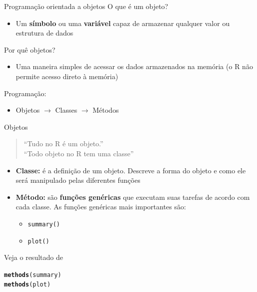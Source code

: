 \documentclass[10pt,handout]{beamer}\usepackage[]{graphicx}\usepackage[]{color}
\makeatletter
\newcommand{\hlstd}[1]{\textcolor[rgb]{0.345,0.345,0.345}{#1}}%
\newcommand{\hlkwd}[1]{\textcolor[rgb]{0.737,0.353,0.396}{\textbf{#1}}}%
\newenvironment{kframe}{%
 \def\at@end@of@kframe{}%
 \ifinner\ifhmode%
  \def\at@end@of@kframe{\end{minipage}}%
  \begin{minipage}{\columnwidth}%
 \fi\fi%
 \def\FrameCommand##1{\hskip\@totalleftmargin \hskip-\fboxsep
 \colorbox{shadecolor}{##1}\hskip-\fboxsep
     \hskip-\linewidth \hskip-\@totalleftmargin \hskip\columnwidth}%
 \MakeFramed {\advance\hsize-\width
   \@totalleftmargin\z@ \linewidth\hsize
   \@setminipage}}%
 {\par\unskip\endMakeFramed%
 \at@end@of@kframe}
\newenvironment{knitrout}{}{} %
\makeatother
\begin{document}
\begin{frame}[fragile]{Programação orientada a objetos}
O que é um objeto?
\begin{itemize}
\item Um \textbf{símbolo} ou uma \textbf{variável} capaz de armazenar
  qualquer valor ou estrutura de dados
\end{itemize}
Por quê objetos?
\begin{itemize}
\item Uma maneira simples de acessar os dados armazenados na memória (o
  R não permite acesso direto à memória)
\end{itemize}
Programação:
\begin{itemize}
\item Objetos $\rightarrow$ Classes $\rightarrow$ Métodos
\end{itemize}
\end{frame}

\begin{frame}[fragile]{Objetos}
\begin{quote}
    ``Tudo no R é um objeto.''\\
    ``Todo objeto no R tem uma classe''
\end{quote}
\begin{itemize}
\item \textbf{Classe:} é a definição de um objeto. Descreve a forma do
  objeto e como ele será manipulado pelas diferentes funções
\item \textbf{Método:} são \textbf{funções genéricas} que executam suas
  tarefas de acordo com cada classe. As funções genéricas mais
  importantes são:
  \begin{itemize}
  \item \verb|summary()|
  \item \verb|plot()|
  \end{itemize}
\end{itemize}
Veja o resultado de
\begin{knitrout}\small
{}\color{fgcolor}\begin{kframe}
\begin{alltt}
\hlkwd{methods}\hlstd{(summary)}
\hlkwd{methods}\hlstd{(plot)}
\end{alltt}
\end{kframe}
\end{knitrout}
\end{frame}
\end{document}
